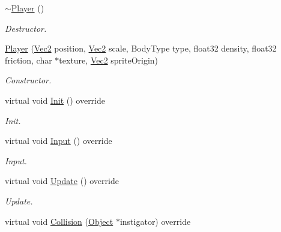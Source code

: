 \begin{DoxyCompactItemize}
\item 
\mbox{\label{class_player_a749d2c00e1fe0f5c2746f7505a58c062}} 
\hyperlink{class_player_a749d2c00e1fe0f5c2746f7505a58c062}{$\sim$\+Player} ()
\begin{DoxyCompactList}\small\item\em Destructor. \end{DoxyCompactList}\item 
\mbox{\label{class_player_a14a4e703b6b79c276ce7ab140f0845ea}} 
\hyperlink{class_player_a14a4e703b6b79c276ce7ab140f0845ea}{Player} (\hyperlink{struct_vec2}{Vec2} position, \hyperlink{struct_vec2}{Vec2} scale, Body\+Type type, float32 density, float32 friction, char $\ast$texture, \hyperlink{struct_vec2}{Vec2} sprite\+Origin)
\begin{DoxyCompactList}\small\item\em Constructor. \end{DoxyCompactList}\item 
\mbox{\label{class_player_af64df6bf1ab0c29d140dd6303262d72f}} 
virtual void \hyperlink{class_player_af64df6bf1ab0c29d140dd6303262d72f}{Init} () override
\begin{DoxyCompactList}\small\item\em Init. \end{DoxyCompactList}\item 
\mbox{\label{class_player_a627395e12f5cff3da2c1c9c4395bb0b9}} 
virtual void \hyperlink{class_player_a627395e12f5cff3da2c1c9c4395bb0b9}{Input} () override
\begin{DoxyCompactList}\small\item\em Input. \end{DoxyCompactList}\item 
\mbox{\label{class_player_a26be3456a62fc667bb4b3adb4ed77233}} 
virtual void \hyperlink{class_player_a26be3456a62fc667bb4b3adb4ed77233}{Update} () override
\begin{DoxyCompactList}\small\item\em Update. \end{DoxyCompactList}\item 
virtual void \hyperlink{class_player_ac2e2422e1637707ed0a032f17392b16b}{Collision} (\hyperlink{class_object}{Object} $\ast$instigator) override

\end{DoxyCompactItemize}
